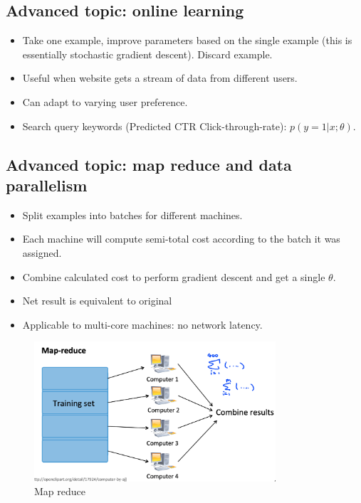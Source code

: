 \subsection{Advanced topic: online learning}
\begin{itemize}
    \item Take one example, improve parameters based on the single example (this is essentially stochastic gradient descent). Discard example. 
    \item Useful when website gets a stream of data from different users. 
    \item Can adapt to varying user preference.
    \item Search query keywords (Predicted CTR Click-through-rate): $p(y=1 | x;\theta)$.
\end{itemize}
\subsection{Advanced topic: map reduce and data parallelism}
\begin{itemize}
    \item Split examples into batches for different machines. 
    \item Each machine will compute semi-total cost according to the batch it was assigned. 
    \item Combine calculated cost to perform gradient descent and get a single $\theta$.
    \item Net result is equivalent to original 
    \item Applicable to multi-core machines: no network latency.
\end{itemize}

\begin{figure}[htpb]
    \centering
    \includegraphics[width=0.8\textwidth]{image/map-reduce.png}
    \caption{Map reduce}
    \label{fig:map-reduce}
\end{figure}

